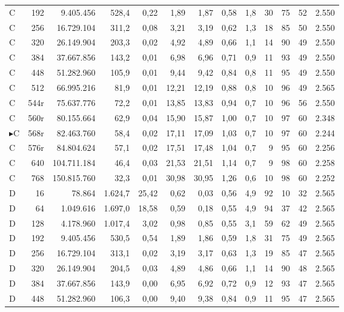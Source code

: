 {\begin{longtable}{l r r r r r r r r r r r r}
C & 192 & 9.405.456 & 528,4 & 0,22 & 1,89 & 1,87 & 0,58 & 1,8 & 30 & 75 & 52 & 2.550 \\
C & 256 & 16.729.104 & 311,2 & 0,08 & 3,21 & 3,19 & 0,62 & 1,3 & 18 & 85 & 50 & 2.550 \\
C & 320 & 26.149.904 & 203,3 & 0,02 & 4,92 & 4,89 & 0,66 & 1,1 & 14 & 90 & 49 & 2.550 \\
C & 384 & 37.667.856 & 143,2 & 0,01 & 6,98 & 6,96 & 0,71 & 0,9 & 11 & 93 & 49 & 2.550 \\
C & 448 & 51.282.960 & 105,9 & 0,01 & 9,44 & 9,42 & 0,84 & 0,8 & 11 & 95 & 49 & 2.550 \\
C & 512 & 66.995.216 & 81,9 & 0,01 & 12,21 & 12,19 & 0,88 & 0,8 & 10 & 96 & 49 & 2.565 \\
C & 544r & 75.637.776 & 72,2 & 0,01 & 13,85 & 13,83 & 0,94 & 0,7 & 10 & 96 & 56 & 2.550 \\
C & 560r & 80.155.664 & 62,9 & 0,04 & 15,90 & 15,87 & 1,00 & 0,7 & 10 & 97 & 60 & 2.348 \\
$\blacktriangleright$C & 568r & 82.463.760 & 58,4 & 0,02 & 17,11 & 17,09 & 1,03 & 0,7 & 10 & 97 & 60 & 2.244 \\
C & 576r & 84.804.624 & 57,1 & 0,02 & 17,51 & 17,48 & 1,04 & 0,7 & 9 & 95 & 60 & 2.256 \\
C & 640 & 104.711.184 & 46,4 & 0,03 & 21,53 & 21,51 & 1,14 & 0,7 & 9 & 98 & 60 & 2.258 \\
C & 768 & 150.815.760 & 32,3 & 0,01 & 30,98 & 30,95 & 1,26 & 0,6 & 10 & 98 & 60 & 2.252 \\
\midrule
D & 16 & 78.864 & 1.624,7 & 25,42 & 0,62 & 0,03 & 0,56 & 4,9 & 92 & 10 & 32 & 2.565 \\
D & 64 & 1.049.616 & 1.697,0 & 18,58 & 0,59 & 0,18 & 0,55 & 4,9 & 94 & 37 & 42 & 2.565 \\
D & 128 & 4.178.960 & 1.017,4 & 3,02 & 0,98 & 0,85 & 0,55 & 3,1 & 59 & 62 & 49 & 2.565 \\
D & 192 & 9.405.456 & 530,5 & 0,54 & 1,89 & 1,86 & 0,59 & 1,8 & 31 & 75 & 49 & 2.565 \\
D & 256 & 16.729.104 & 313,1 & 0,02 & 3,19 & 3,17 & 0,63 & 1,3 & 19 & 85 & 47 & 2.565 \\
D & 320 & 26.149.904 & 204,5 & 0,03 & 4,89 & 4,86 & 0,66 & 1,1 & 14 & 90 & 48 & 2.565 \\
D & 384 & 37.667.856 & 143,9 & 0,00 & 6,95 & 6,92 & 0,72 & 0,9 & 12 & 93 & 47 & 2.565 \\
D & 448 & 51.282.960 & 106,3 & 0,00 & 9,40 & 9,38 & 0,84 & 0,9 & 11 & 95 & 47 & 2.565 \\

\end{longtable}}
